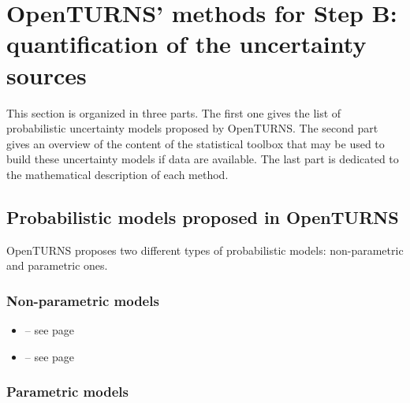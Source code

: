 \section{OpenTURNS' methods for Step B: quantification of the uncertainty sources}

This section is organized in three parts. The first one gives the list of probabilistic uncertainty models proposed by OpenTURNS. The second part gives an overview of the content of the statistical toolbox that may be used to build these uncertainty models if data are available. The last part is dedicated to the mathematical description of each method. \\


\subsection{Probabilistic models proposed in OpenTURNS}

OpenTURNS proposes two different types of probabilistic models: non-parametric and parametric ones.

\subsubsection{Non-parametric models}

\begin{itemize}

\item {} -- see page \pageref{docref_B11_EmpiricalCDF} \vspace{2mm}
\item {} -- see page \pageref{docref_B11_KernelSmoothing} \vspace{2mm}

\end{itemize}

\subsubsection{Parametric models}

